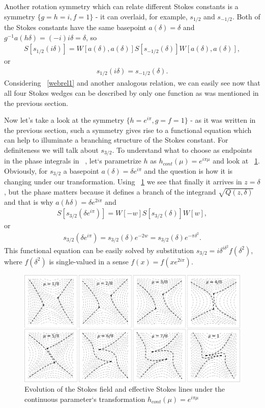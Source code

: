 \documentclass[12pt]{iopart}
\begin{document}
Another rotation symmetry which can relate different Stokes constants is a symmetry $\{g=h=i,f=1\}$ - it can overlaid, for example, 
$s_{1/2}$ and $s_{-1/2}$. Both of the Stokes constants have the same basepoint $a(\delta)=\delta$ 
and $g^{-1}a(h\delta)=(-i)i\delta=\delta$, so
\begin{eqnarray}
S[s_{1/2}(i\delta)] = W[a(\delta),a(\delta)]S[s_{-1/2}(\delta)]W[a(\delta),a(\delta)],
\label{webrs2}
\end{eqnarray}
or
\begin{eqnarray}
s_{1/2}(i\delta) = s_{-1/2}(\delta).
\label{webrel2}
\end{eqnarray}
Considering ~\ref{webrel1} and another analogous relation, we can easily see now that all four Stokes wedges can be described by only one function as was mentioned in the previous section. 

Now let's take a look at the symmetry $\{h=e^{i\pi},g=f=1\}$ - as it was written in the previous section, such a symmetry gives rise to a functional equation which can help to illuminate a branching structure of the Stokes constant. 
For definiteness we will talk about $s_{3/2}$. To understand what to choose as endpoints in the phase integrals in ~, let`s parametrize $h$ as $h_{cont}(\mu)=e^{i\pi\mu}$ and look at ~\ref{wrs}. Obviously, for $s_{3/2}$ a basepoint $a(\delta)=\delta e^{i\pi}$ and the question is how it is changing under our transformation. Using ~\ref{wrs} we see that finally it arrives in $z=\delta$, but the phase matters because it defines a branch of the integrand $\sqrt{Q(z,\delta)}$ and that is why 
$a(h\delta)=\delta e^{2i\pi}$ and
\begin{eqnarray}
S[s_{3/2}(\delta e^{i\pi})] = W[-w]S[s_{3/2}(\delta)]W[w],
\label{webrs3}
\end{eqnarray}
or
\begin{eqnarray}
s_{3/2}(\delta e^{i\pi})=s_{3/2}(\delta)e^{-2w}=s_{3/2}(\delta)e^{-\pi\delta^2}.
\label{webrel3}
\end{eqnarray}
This functional equation can be easily solved by substitution $s_{3/2}=i\delta^{i\delta^2}f(\delta^2)$, where $f(\delta^2)$
is single-valued in a sense $f(x)=f(x e^{2i\pi})$.

\begin{figure}
\centering
\noindent
\includegraphics[scale=.5]{stuff/wrs.png}
\caption{Evolution of the Stokes field and effective Stokes lines 
under the continuous parameter`s transformation $h_{cont}(\mu)=e^{i\pi\mu}$}
\label{wrs}
\end{figure} 
\end{document}
